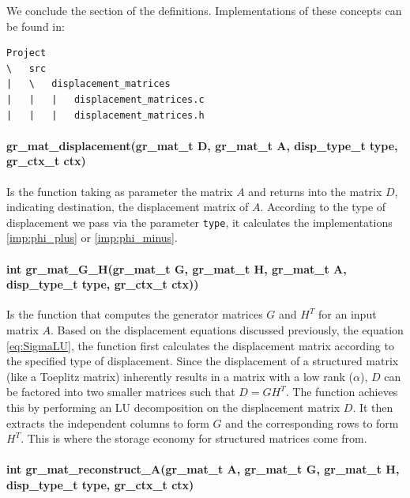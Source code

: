 We conclude the section of the definitions.
Implementations of these concepts can be found in:

\begin{verbatim}
Project
\   src
|   \   displacement_matrices
|   |   |   displacement_matrices.c
|   |   |   displacement_matrices.h
\end{verbatim}

\paragraph{gr\_mat\_displacement(gr\_mat\_t D, gr\_mat\_t A, disp\_type\_t type, gr\_ctx\_t ctx)}
Is the function taking as parameter the matrix $A$ and returns into the matrix $D$, indicating destination, the displacement matrix of $A$.
According to the type of displacement we pass via the parameter \texttt{type}, it calculates the implementations \eqref{imp:phi_plus} or \eqref{imp:phi_minus}.

\paragraph{int gr\_mat\_G\_H(gr\_mat\_t G, gr\_mat\_t H, gr\_mat\_t A, disp\_type\_t type, gr\_ctx\_t ctx))}
Is the function that computes the generator matrices $G$ and $H^T$ for an input matrix $A$.
Based on the displacement equations discussed previously, the equation \eqref{eq:SigmaLU}, the function first calculates the displacement matrix according to the specified type of displacement.
Since the displacement of a structured matrix (like a Toeplitz matrix) inherently results in a matrix with a low rank ($\alpha$),
$D$ can be factored into two smaller matrices such that $D = G H^T$.
The function achieves this by performing an LU decomposition on the displacement matrix $D$. It then extracts the independent columns to form $G$ and the corresponding rows to form $H^T$.
This is where the storage economy for structured matrices come from.

\paragraph{int gr\_mat\_reconstruct\_A(gr\_mat\_t A, gr\_mat\_t G, gr\_mat\_t H, disp\_type\_t type, gr\_ctx\_t ctx)}

